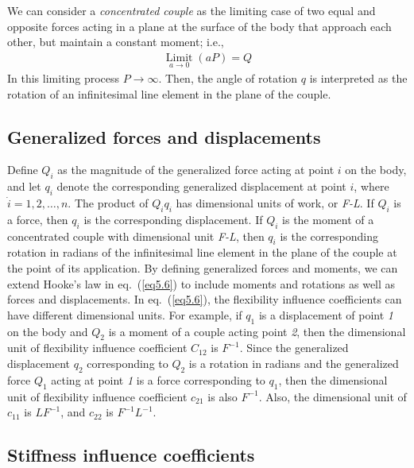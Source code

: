 \documentclass{AeroStructure-ERJohnson}
\begin{document}
We can consider a \textit{concentrated couple} as the limiting case of two equal and opposite forces acting in a plane at the surface of the body that approach each other, but maintain a constant moment; i.e.,
\begin{align*}
\underset{a \rightarrow 0}{\operatorname{Limit}}(a P)=Q
\end{align*}
In this limiting process $P \rightarrow \infty$. Then, the angle of rotation $q$ is interpreted as the rotation of an infinitesimal line element in the plane of the couple.

\subsection{Generalized forces and displacements}\label{sec5.2.1}

Define $Q_{i}$ as the magnitude of the generalized force acting at point $i$ on the body, and let $ q_{i} $ denote the corresponding generalized displacement at point $i$, where $ \dot{i}=1,2, \ldots, n $. The product of $ Q_{i} q_{i} $ has dimensional units of work, or \textit{F-L}. If $Q_{i}$ is a force, then $q_{i}$ is the corresponding displacement. If $Q_{i}$ is the moment of a concentrated couple with dimensional unit \textit{F-L}, then $q_{i}$ is the corresponding rotation in radians of the infinitesimal line element in the plane of the couple at the point of its application. By defining generalized forces and moments, we can extend Hooke's law in eq.~(\ref{eq5.6}) to include moments and rotations as well as forces and displacements. In eq.~(\ref{eq5.6}), the flexibility influence coefficients can have different dimensional units. For example, if $q_{1}$ is a displacement of point \textit{1} on the body and $Q_{2}$ is a moment of a couple acting point \textit{2}, then the dimensional unit of flexibility influence coefficient $ C_{12} $ is $ F^{-1} $. Since the generalized displacement $q_{2}$ corresponding to $Q_{2}$ is a rotation in radians and the generalized force $Q_{1}$ acting at point \textit{1} is a force corresponding to $q_{1}$, then the dimensional unit of flexibility influence coefficient $ c_{21} $ is also $ F^{-1} $. Also, the dimensional unit of $ c_{11}$ is $L F^{-1}$, and $c_{22}$ is $F^{-1} L^{-1}$.

\subsection{Stiffness influence coefficients}\label{sec5.2.2}
\end{document}

